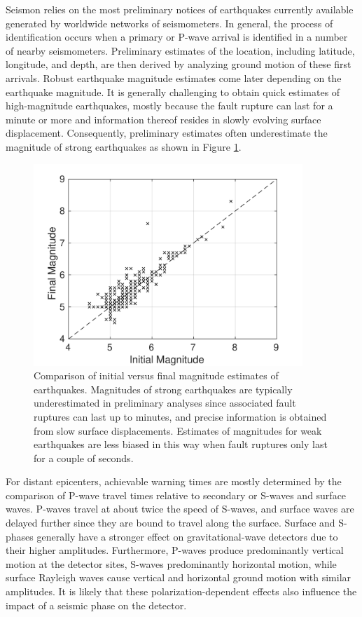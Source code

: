 \documentclass[reprint, prl, aps, showpacs]{revtex4-1}
\newcommand{\seismon}{\textnormal{Seismon }}
\begin{document}
\seismon relies on the most preliminary notices of earthquakes currently available generated by worldwide networks of seismometers. In general, the process of identification occurs when a primary or P-wave arrival is identified in a number of nearby seismometers. Preliminary estimates of the location, including latitude, longitude, and depth, are then derived by analyzing ground motion of these first arrivals. Robust earthquake magnitude estimates come later depending on the earthquake magnitude. It is generally challenging to obtain quick estimates of high-magnitude earthquakes, mostly because the fault rupture can last for a minute or more and information thereof resides in slowly evolving surface displacement. Consequently, preliminary estimates often underestimate the magnitude of strong earthquakes as shown in Figure \ref{fig:initialfinal}.
\begin{figure}[t]
\hspace*{-0.5cm}
\centering
\includegraphics[width=4in]{initial_vs_final_mag.pdf}
\caption{Comparison of initial versus final magnitude estimates of earthquakes. Magnitudes of strong earthquakes are typically underestimated in preliminary analyses since associated fault ruptures can last up to minutes, and precise information is obtained from slow surface displacements. Estimates of magnitudes for weak earthquakes are less biased in this way when fault ruptures only last for a couple of seconds.}
 \label{fig:initialfinal}
 \end{figure}

For distant epicenters, achievable warning times are mostly determined by the comparison of P-wave travel times relative to secondary or S-waves and surface waves. P-waves travel at about twice the speed of S-waves, and surface waves are delayed further since they are bound to travel along the surface. Surface and S-phases generally have a stronger effect on gravitational-wave detectors due to their higher amplitudes. Furthermore, P-waves produce predominantly vertical motion at the detector sites, S-waves predominantly horizontal motion, while surface Rayleigh waves cause vertical and horizontal ground motion with similar amplitudes. It is likely that these polarization-dependent effects also influence the impact of a seismic phase on the detector.
\end{document}
